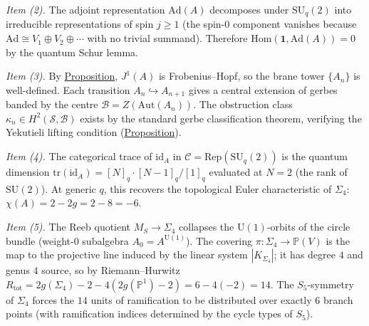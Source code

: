 \begin{proposition}
\emph{Item (2).}
The adjoint representation $\mathrm{Ad}(A)$ decomposes under
$\mathrm{SU}_q(2)$ into irreducible representations of spin $j \geq 1$
(the spin-$0$ component vanishes because
$\mathrm{Ad} \cong V_1 \oplus V_2 \oplus \cdots$ with no trivial
summand).  Therefore $\mathrm{Hom}(\mathbf{1}, \mathrm{Ad}(A)) = 0$ by
the quantum Schur lemma.

\emph{Item (3).}
By \hyperref[prop:jet-prolongation]{Proposition}, $J^1(A)$ is Frobenius--Hopf, so
the brane tower $\{A_n\}$ is well-defined.  Each transition
$A_n \hookrightarrow A_{n+1}$ gives a central extension of gerbes banded by
the centre $\mathcal{B} = Z(\mathrm{Aut}(A_n))$.  The obstruction class
$\kappa_n \in H^2(\mathcal{S}, \mathcal{B})$ exists by the standard gerbe
classification theorem, verifying the Yekutieli lifting condition
(\hyperref[prop:yekutieli-lifting]{Proposition}).

\emph{Item (4).}
The categorical trace of $\mathrm{id}_A$ in
$\mathcal{C} = \mathrm{Rep}(\mathrm{SU}_q(2))$ is the quantum dimension
$\mathrm{tr}(\mathrm{id}_A) = [N]_q \cdot [N-1]_q / [1]_q$ evaluated at
$N = 2$ (the rank of $\mathrm{SU}(2)$).  At generic $q$, this recovers
the topological Euler characteristic of $\Sigma_4$:
$\chi(A) = 2 - 2g = 2 - 8 = -6$.

\emph{Item (5).}
The Reeb quotient $M_S \to \Sigma_4$ collapses the $\mathrm{U}(1)$-orbits
of the circle bundle (weight-$0$ subalgebra $A_0 = A^{\mathrm{U}(1)}$).
The covering $\pi \colon \Sigma_4 \to \mathbb{P}(V)$ is the map to the
projective line induced by the linear system $|K_{\Sigma_4}|$; it has
degree $4$ and genus $4$ source, so by Riemann--Hurwitz
$R_{\mathrm{tot}} = 2g(\Sigma_4) - 2 - 4(2g(\mathbb{P}^1) - 2) =
6 - 4(-2) = 14$.
The $S_5$-symmetry of $\Sigma_4$ forces the $14$ units of ramification to
be distributed over exactly $6$ branch points (with ramification indices
determined by the cycle types of $S_5$).
\end{proposition}
